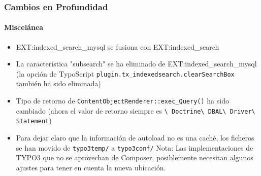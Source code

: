 
\begin{frame}[fragile]
	\frametitle{Cambios en Profundidad}
	\framesubtitle{Miscelánea}

	\begin{itemize}

		\item EXT:indexed\_search\_mysql se fusiona con EXT:indexed\_search

		\item La característica "subsearch" se ha eliminado de EXT:indexed\_search\_mysql\newline
			\smaller
				(la opción de TypoScript \texttt{plugin.tx\_indexedsearch.clearSearchBox} también ha sido eliminada)
			\normalsize

		\item Tipo de retorno de \texttt{ContentObjectRenderer::exec\_Query()} ha sido cambiado\newline
			\smaller
				(ahora el valor de retorno siempre es
					\texttt{\textbackslash
						Doctrine\textbackslash
						DBAL\textbackslash
						Driver\textbackslash
						Statement})
			\normalsize

		\item Para dejar claro que la información de autoload no es una caché, 
		los ficheros se han movido de \texttt{typo3temp/} a \texttt{typo3conf/}\newline
			\smaller
				Nota: Las implementaciones de TYPO3 que no se aprovechan de Composer,
				posiblemente necesitan algunos ajustes para tener en cuenta la nueva ubicación.
			\normalsize

	\end{itemize}

\end{frame}

